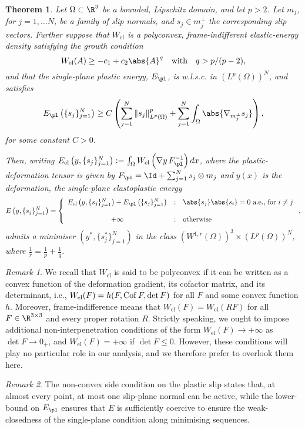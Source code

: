 \documentclass[11pt,reqno]{amsart}
\theoremstyle{plain}
\newtheorem{theorem}{Theorem}
\theoremstyle{definition}
\theoremstyle{remark}
\newtheorem{remark}{Remark}
\begin{document}
\begin{theorem}\label{thm:main}
Let $\Omega \subset \R^3$ be a bounded, Lipschitz domain, and let $p>2$. Let $m_j$, for $j=1,\ldots N$, be a family of slip normals, and $s_j\in m_j^{\perp}$ the corresponding slip vectors. Further suppose that $W_{\mathrm{el}}$ is a polyconvex, frame-indifferent elastic-energy density satisfying the growth condition 
\[
W_{\mathrm{el}}(A) \ge -c_1 + c_2\abs{A}^q\quad \textrm{with}\quad q>p/(p-2),
\]
and that the single-plane plastic energy, $E_\pl$, is w.l.s.c. in $(L^p(\Omega))^N$, and satisfies 
\[
E_\pl\left(\{s_j\}_{j=1}^N\right)\geq C\left(\sum_{j=1}^N \|{s_j}\|_{L^p(\Omega)}^p + \sum_{j=1}^N\int_{\Omega}\abs{\nabla_{m_j^\perp} s_j}\right),
\]
for some constant $C>0$.


Then, writing $E_{\mathrm{el}}\left(y, \{s_j\}_{j=1}^N\right):= \int_{\Omega} W_{\mathrm{el}}\left(\nabla y\,F_\pl^{-1}\right)dx$, where the plastic-deformation tensor is given by $F_\pl = \Id + \sum_{j=1}^N s_j \otimes m_j$ and $y(x)$ is the deformation, the single-plane elastoplastic energy
\[
E\left(y, \{s_j\}_{j=1}^N\right) =  \left\{\begin{array}{ccl}
 E_{\mathrm{el}}\left(y, \{s_j\}_{j=1}^N\right) + E_\pl\left(\{s_j\}_{j=1}^N\right) & : & \abs{s_j}\abs{s_i} = 0~\textrm{a.e., for}~i\neq j\\
 & & \\
 +\infty & : & \mathrm{otherwise}
\end{array} \right.,
\]
admits a minimiser $\left(y^{\ast},\{s^{\ast}_j\}_{j=1}^N\right)$ in the class $(W^{1,r}(\Omega))^3\times (L^p(\Omega))^N$, where $\frac{1}{r}=\frac{1}{p}+\frac{1}{q}$.
\end{theorem}

\begin{remark}
We recall that $W_{\mathrm{el}}$ is said to be polyconvex \cite{Ball_1977} if  it can be written as a convex function of the deformation gradient, its cofactor matrix, and its determinant, i.e., $W_{\mathrm{el}}(F)=h(F,{\rm Cof}\, F, {\rm det}\, F)$ for all $F$ and some convex function $h$. Moreover, frame-indifference means that $W_{\mathrm{el}}(F) =W_{\mathrm{el}}(RF)$ for all $F\in\R^{3\times 3}$ and every proper rotation $R$.
Strictly speaking, we ought to impose additional non-interpenetration conditions of the form $W_{\mathrm{el}}(F)\to+\infty$ as $\det F\to 0_+$, and $W_{\mathrm{el}}(F)=+\infty$ if $\det F\le 0$. However, these conditions will play no particular role in our analysis, and we therefore prefer to overlook them here. 
 
 

\end{remark}
\begin{remark}
The non-convex side condition on the plastic slip states that, at almost every point, at most one slip-plane normal can be active, while the lower-bound on $E_\pl$ ensures that $E$ is sufficiently coercive to ensure the weak-closedness of the single-plane condition along minimising sequences. 


\end{remark}
\end{document}
